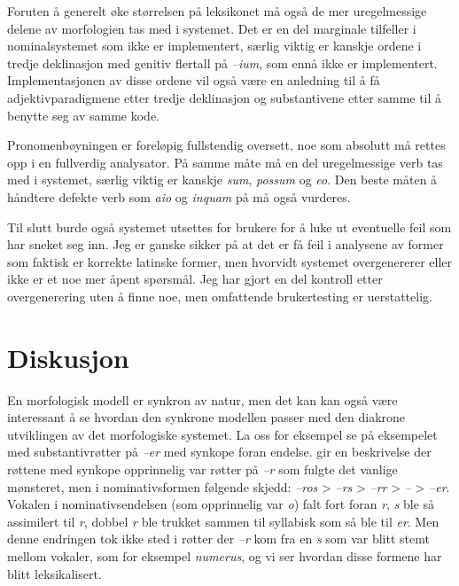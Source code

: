 \documentclass{article}
\let\tipa\textipa
\let\w\emph
\begin{document}
Foruten \aa{} generelt \o{}ke st\o{}rrelsen p\aa{} leksikonet m\aa{} ogs\aa{}
de mer uregelmessige delene av morfologien tas med i systemet. Det er en del
marginale tilfeller i nominalsystemet som ikke er implementert, s\ae{}rlig
viktig er kanskje ordene i tredje deklinasjon med genitiv flertall p\aa{}
\w{--ium}, som enn\aa{} ikke er implementert. Implementasjonen av disse ordene
vil ogs\aa{} v\ae{}re en anledning til \aa{} f\aa{} adjektivparadigmene etter
tredje deklinasjon og substantivene etter samme til \aa{} benytte seg av samme
kode.

Pronomenb\o{}yningen er forel\o{}pig fullstendig oversett, noe som absolutt
m\aa{} rettes opp i en fullverdig analysator. P\aa{} samme m\aa{}te m\aa{} en
del uregelmessige verb tas med i systemet, s\ae{}rlig viktig er kanskje
\w{sum}, \w{possum} og \w{eo}. Den beste m\aa{}ten \aa{} h\aa{}ndtere defekte
verb som \w{aio} og \w{inquam} p\aa{} m\aa{} ogs\aa{} vurderes.

Til slutt burde ogs\aa{} systemet utsettes for brukere for \aa{} luke ut
eventuelle feil som har sneket seg inn. Jeg er ganske sikker p\aa{} at det er
f\aa{} feil i analysene av former som faktisk er korrekte latinske former, men
hvorvidt systemet overgenererer eller ikke er et noe mer \aa{}pent
sp\o{}rsm\aa{}l. Jeg har gjort en del kontroll etter overgenerering uten \aa{}
finne noe, men omfattende brukertesting er uerstattelig.

\section{Diskusjon}
\label{diskusjon}
En morfologisk modell er synkron av natur, men det kan kan ogs\aa{} v\ae{}re
interessant \aa{} se hvordan den synkrone modellen passer med den diakrone
utviklingen av det morfologiske systemet. La oss for eksempel se p\aa{}
eksempelet med substantivr\o{}tter p\aa{} \w{--er} med synkope foran endelse.
 gir en beskrivelse der r\o{}ttene med synkope opprinnelig var
r\o{}tter p\aa{} \w{--r} som fulgte det vanlige m\o{}nsteret, men i
nominativsformen f\o{}lgende skjedd: \w{--ros} > \w{--rs} > \w{--rr} >
\w{--\tipa{\r*r}} > \w{--er}. Vokalen i nominativsendelsen (som opprinnelig
var \w{o}) falt fort foran \w{r}, \w{s} ble s\aa{} assimilert til \w{r},
dobbel \w{r} ble trukket sammen til syllabisk \w{\tipa{\r*r}} som s\aa{} ble
til \w{er}. Men denne endringen tok ikke sted i r\o{}tter der \w{--r} kom fra
en \w{s} som var blitt stemt mellom vokaler, som for eksempel \w{numerus}, og
vi ser hvordan disse formene har blitt leksikalisert.
\end{document}
